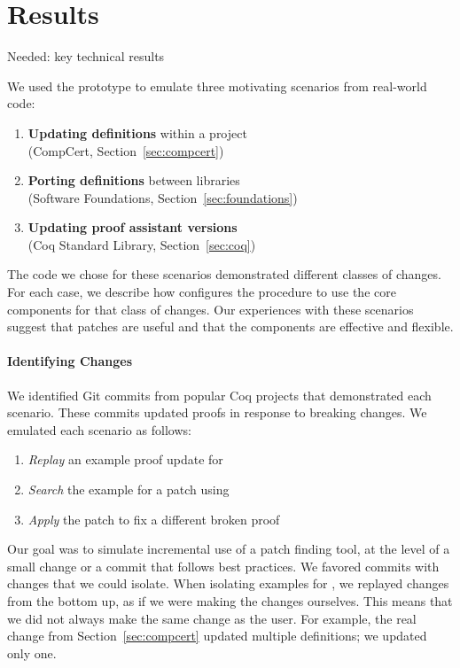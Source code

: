 \section{Results}
\label{sec:pumpkin-results}

Needed: key technical results


We used the \sysname prototype to emulate three motivating scenarios from real-world code:

\begin{enumerate}
\item \textbf{Updating definitions} within a project \\
(CompCert, Section~\ref{sec:compcert})
\item \textbf{Porting definitions} between libraries \\
(Software Foundations, Section~\ref{sec:foundations})
\item \textbf{Updating proof assistant versions} \\
(Coq Standard Library, Section~\ref{sec:coq})
\end{enumerate}

The code we chose for these scenarios demonstrated different classes of changes.
For each case, we describe how \sysname configures the procedure to use the core components for that class of changes.
Our experiences with these scenarios suggest that patches are useful and that the components 
are effective and flexible.

\paragraph{Identifying Changes} We identified Git commits from popular Coq projects that
demonstrated each scenario.
These commits updated proofs in response to breaking changes.
We emulated each scenario as follows:

\begin{enumerate}
\item \textit{Replay} an example proof update for \sysname
\item \textit{Search} the example for a patch using \sysname
\item \textit{Apply} the patch to fix a different broken proof
\end{enumerate}

Our goal was to simulate incremental use of a patch finding tool,
at the level of a small change or a commit that follows best practices.
We favored commits with changes that we could
isolate. When isolating examples for \sysname, we replayed changes from the bottom up,
as if we were making the changes ourselves.
This means that we did not always make the same change as the user. For example,
the real change from Section~\ref{sec:compcert} updated multiple definitions;
we updated only one.

